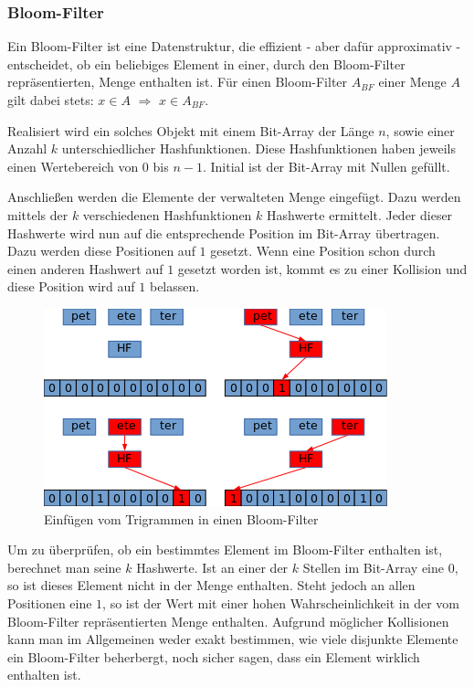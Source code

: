 \subsubsection{Bloom-Filter}

Ein Bloom-Filter ist eine Datenstruktur, die effizient - aber dafür approximativ - entscheidet,
ob ein beliebiges Element in einer, durch den Bloom-Filter repräsentierten, Menge enthalten ist.
Für einen Bloom-Filter $A_{BF}$ einer Menge $A$ gilt dabei stets: $x \in A$ $\Rightarrow$ $x \in A_{BF}$.

Realisiert wird ein solches Objekt mit einem Bit-Array der Länge $n$,
sowie einer Anzahl $k$ unterschiedlicher Hashfunktionen.
Diese Hashfunktionen haben jeweils einen Wertebereich von $0$ bis $n - 1$.
Initial ist der Bit-Array mit Nullen gefüllt.

Anschließen werden die Elemente der verwalteten Menge eingefügt.
Dazu werden mittels der $k$ verschiedenen Hashfunktionen $k$ Hashwerte ermittelt.
Jeder dieser Hashwerte wird nun auf die entsprechende Position im Bit-Array übertragen.
Dazu werden diese Positionen auf $1$ gesetzt.
Wenn eine Position schon durch einen anderen Hashwert auf $1$ gesetzt worden ist,
kommt es zu einer Kollision und diese Position wird auf $1$ belassen.

\begin{figure}
	\includegraphics[width=.48\textwidth]{bloom_filter_example_insert.png}
	\caption{Einfügen vom Trigrammen in einen Bloom-Filter}
	\label{fig:add_bf}
	\vspace*{-0.4cm}
\end{figure}

Um zu überprüfen, ob ein bestimmtes Element im Bloom-Filter enthalten ist, berechnet man seine $k$ Hashwerte.
Ist an einer der $k$ Stellen im Bit-Array eine $0$, so ist dieses Element nicht in der Menge enthalten.
Steht jedoch an allen Positionen eine $1$, so ist der Wert mit einer hohen Wahrscheinlichkeit in der vom Bloom-Filter repräsentierten Menge enthalten.
Aufgrund möglicher Kollisionen kann man im Allgemeinen weder exakt bestimmen,
wie viele disjunkte Elemente ein Bloom-Filter beherbergt, noch sicher sagen, dass ein Element wirklich enthalten ist.

